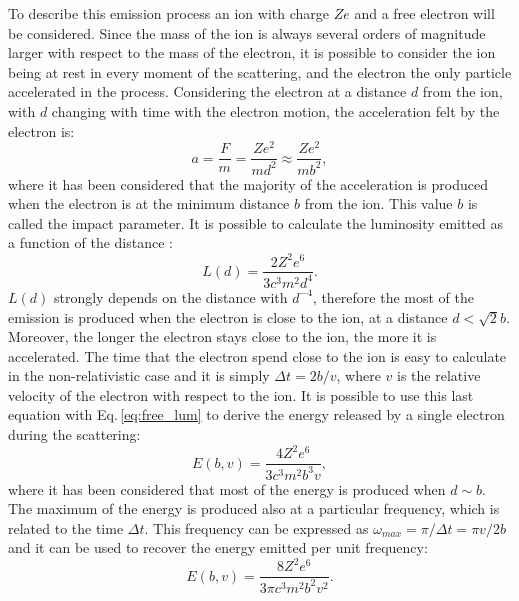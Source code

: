 \documentclass[../main.tex]{subfiles}
\begin{document}
To describe this emission process an ion with charge $Ze$ and a free electron will be considered.
Since the mass of the ion is always several orders of magnitude larger with respect to the mass of the electron, it is possible to consider the ion being at rest in every moment of the scattering, and the electron the only particle accelerated in the process.
Considering the electron at a distance $d$ from the ion, with $d$ changing with time with the electron motion, the acceleration felt by the electron is:
\begin{equation}
    \label{eq:acceleration}
    a = \frac{F}{m} = \frac{Ze^2}{md^2}\approx \frac{Ze^2}{mb^2},
\end{equation}
where it has been considered that the majority of the acceleration is produced when the electron is at the minimum distance $b$ from the ion.
This value $b$ is called the impact parameter.
It is possible to calculate the luminosity emitted as a function of the distance \citep{Deyoung02}:
\begin{equation}
    \label{eq:free_lum}
    L(d) = \frac{2Z^2e^6}{3c^3m^2d^4}.
\end{equation}
$L(d)$ strongly depends on the distance with $d^{-4}$, therefore the most of the emission is produced when the electron is close to the ion, at a distance $d<\sqrt{2}b$.
Moreover, the longer the electron stays close to the ion, the more it is accelerated.
The time that the electron spend close to the ion is easy to calculate in the non-relativistic case and it is simply $\Delta t = 2b/v$, where $v$ is the relative velocity of the electron with respect to the ion.
It is possible to use this last equation with Eq.\,\ref{eq:free_lum} to derive the energy released by a single electron during the scattering:
\begin{equation}
    \label{eq:free_energy}
    E(b,v) = \frac{4Z^2e^6}{3c^3m^2b^3v},
\end{equation}
where it has been considered that most of the energy is produced when $d\sim b$.
The maximum of the energy is produced also at a particular frequency, which is related to the time $\Delta t$.
This frequency can be expressed as $\omega_{max} = \pi/\Delta t = \pi v/2b$ and it can be used to recover the energy emitted per unit frequency:
\begin{equation}
    \label{eq:free_energy_freq}
    E(b,v) = \frac{8Z^2e^6}{3\pi c^3m^2b^2v^2}.
\end{equation}
\end{document}
